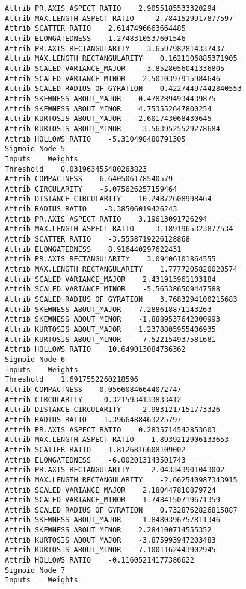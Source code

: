 \documentclass[
	article,			%
	11pt,				%
	oneside,			%
	a4paper,			%
	english,			%
	brazil,				%
	sumario=tradicional
	]{abntex2}
\begin{document}
\begin{lstlisting}
Attrib PR.AXIS ASPECT RATIO    2.9055185533320294
Attrib MAX.LENGTH ASPECT RATIO    -2.7841529917877597
Attrib SCATTER RATIO    2.6147496663664485
Attrib ELONGATEDNESS    1.2748310537601546
Attrib PR.AXIS RECTANGULARITY    3.6597982814337437
Attrib MAX.LENGTH RECTANGULARITY    0.1621106885371905
Attrib SCALED VARIANCE_MAJOR    -3.8528056041336805
Attrib SCALED VARIANCE_MINOR    2.5010397915984646
Attrib SCALED RADIUS OF GYRATION    0.42274497442840553
Attrib SKEWNESS ABOUT_MAJOR    0.4782894934439875
Attrib SKEWNESS ABOUT_MINOR    4.753552647800254
Attrib KURTOSIS ABOUT_MAJOR    2.601743068430645
Attrib KURTOSIS ABOUT_MINOR    -3.5639525529278684
Attrib HOLLOWS RATIO    -5.310498480791305
Sigmoid Node 5
Inputs    Weights
Threshold    0.031963455480263823
Attrib COMPACTNESS    6.640506178540579
Attrib CIRCULARITY    -5.075626257159464
Attrib DISTANCE CIRCULARITY    10.24872608998464
Attrib RADIUS RATIO    -3.38506019426243
Attrib PR.AXIS ASPECT RATIO    3.19613091726294
Attrib MAX.LENGTH ASPECT RATIO    -3.1891965323877534
Attrib SCATTER RATIO    -3.5558719226128868
Attrib ELONGATEDNESS    8.916440297622431
Attrib PR.AXIS RECTANGULARITY    3.09406101864555
Attrib MAX.LENGTH RECTANGULARITY    1.7777205820020574
Attrib SCALED VARIANCE_MAJOR    2.431913961103184
Attrib SCALED VARIANCE_MINOR    -5.565386509447588
Attrib SCALED RADIUS OF GYRATION    3.7683294100215683
Attrib SKEWNESS ABOUT_MAJOR    7.288618871143263
Attrib SKEWNESS ABOUT_MINOR    -1.8889537642000993
Attrib KURTOSIS ABOUT_MAJOR    1.2378805955406935
Attrib KURTOSIS ABOUT_MINOR    -7.522154937581681
Attrib HOLLOWS RATIO    10.649013084736362
Sigmoid Node 6
Inputs    Weights
Threshold    1.6917552260218596
Attrib COMPACTNESS    0.05660846644072747
Attrib CIRCULARITY    -0.3215934133833412
Attrib DISTANCE CIRCULARITY    -2.9831217151773326
Attrib RADIUS RATIO    1.3966488463225797
Attrib PR.AXIS ASPECT RATIO    0.2835714542853603
Attrib MAX.LENGTH ASPECT RATIO    1.8939212906133653
Attrib SCATTER RATIO    1.8126816608109002
Attrib ELONGATEDNESS    -6.002013143501743
Attrib PR.AXIS RECTANGULARITY    -2.043343901043002
Attrib MAX.LENGTH RECTANGULARITY    -2.662540987343915
Attrib SCALED VARIANCE_MAJOR    2.180447810879724
Attrib SCALED VARIANCE_MINOR    1.7484150719671359
Attrib SCALED RADIUS OF GYRATION    0.7328762826815887
Attrib SKEWNESS ABOUT_MAJOR    -1.8480396757811346
Attrib SKEWNESS ABOUT_MINOR    2.284100714555352
Attrib KURTOSIS ABOUT_MAJOR    -3.875993947203483
Attrib KURTOSIS ABOUT_MINOR    7.1001162443902945
Attrib HOLLOWS RATIO    -0.11605214177386622
Sigmoid Node 7
Inputs    Weights

\end{lstlisting}
\end{document}
